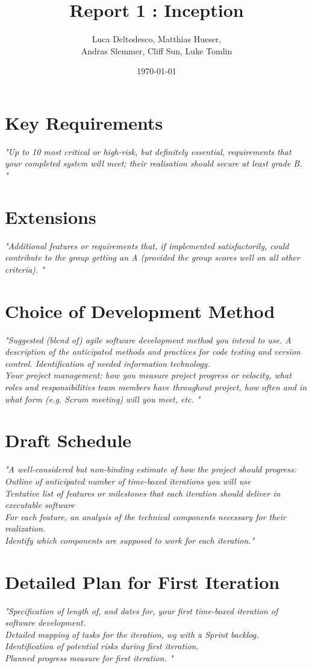 \documentclass[]{article}
\begin{document}
\title{Report 1 : Inception}
\author{Luca Deltodesco, Matthias Hueser, \\Andras Slemmer, Cliff Sun, Luke Tomlin}
\date{\today}
\maketitle

\section{Key Requirements}
\textit{"Up to 10 most critical or high-risk, but definitely essential, requirements that your completed system will meet; their realisation should secure at least grade B. "}

\section{Extensions}
\textit{"Additional features or requirements that, if implemented satisfactorily, could contribute to the group getting an A (provided the group scores well on all other criteria). "}

\section{Choice of Development Method}
\textit{"Suggested (blend of) agile software development method you intend to use.
A description of the anticipated methods and practices for code testing and version control.
Identification of needed information technology.\\
Your project management: how you measure project progress or velocity, what roles and responsibilities team members have throughout project, how often and in what form (e.g. Scrum meeting) will you meet, etc. "}

\section{Draft Schedule}
\textit{"A well-considered but non-binding estimate of how the project should progress:\\
    Outline of anticipated number of time-boxed iterations you will use\\
    Tentative list of features or milestones that each iteration should deliver in executable software\\
    For each feature, an analysis of the technical components necessary for their realization.\\
    Identify which components are supposed to work for each iteration."}

\section{Detailed Plan for First Iteration}
\textit{"Specification of length of, and dates for, your first time-boxed iteration of software development.\\
Detailed mapping of tasks for the iteration, wg with a Sprint backlog.\\
Identification of potential risks during first iteration.\\
Planned progress measure for first iteration. "}
\end{document}
